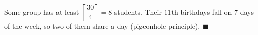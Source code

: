 Some group has at least $\left\lceil\dfrac{30}4\right\rceil=8$ students. Their $11$th birthdays fall on $7$ days of the week, so two of them share a day (pigeonhole principle). $\blacksquare$
